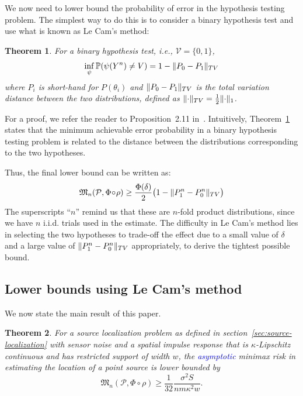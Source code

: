 \documentclass[conference]{IEEEtran}
\DeclarePairedDelimiter\norm{\lVert}{\rVert}
\newcommand{\Phiorho}{\Phi\!\circ\!\rho}
\newtheorem{theorem}{Theorem}
\begin{document}
We now need to lower bound the probability of error in the hypothesis testing
problem. The simplest way to do this is to consider a binary hypothesis test
and use what is known as Le Cam's method:
\begin{theorem} \label{thm:le-cam}
	For a binary hypothesis test, i.e., $\mathcal{V} = \{0, 1\}$,
	\begin{equation}
		\inf_\psi \mathbb P(\psi(Y^n) \neq V) = 1 - \norm{P_0 - P_1}_{TV}
	\end{equation}
	where $P_i$ is short-hand for $P(\theta_i)$ and $\norm{P_0 - P_1}_{TV}$ is
	the total variation distance between the two distributions, defined as
	$\norm{\cdot}_{TV} = \frac{1}{2} \norm{\cdot}_1$.
\end{theorem}
For a proof, we refer the reader to Proposition~2.11
in~\cite{Duchi2015Information}.  Intuitively, Theorem~\ref{thm:le-cam} states
that the minimum achievable error probability in a binary hypothesis testing
problem is related to the distance between the distributions corresponding to
the two hypotheses.

Thus, the final lower bound can be written as:
\begin{equation} \label{eq:le-cam-bound}
	\mathfrak{M}_n(\mathcal P, \Phiorho) \geq \frac{\Phi(\delta)}{2} \big(1 - \norm{P_1^n - P_0^n}_{TV}\big)
\end{equation}
The superscripts ``$n$'' remind us that these are $n$-fold product
distributions, since we have $n$ i.i.d. trials used in the estimate.  The
difficulty in Le Cam's method lies in selecting the two hypotheses to trade-off
the effect due to a small value of $\delta$ and a large value of $\norm{P_1^n -
P_0^n}_{TV}$ appropriately, to derive the tightest possible bound.

\subsection{Lower bounds using Le Cam's method}
\label{sec:lecam-lb}

We now state the main result of this paper.
\begin{theorem} \label{thm:main-lb}
	For a source localization problem as defined in
	section~\ref{sec:source-localization} with sensor noise and a spatial
	impulse response that is $\kappa$-Lipschitz continuous and has restricted
	support of width $w$, the \textcolor{blue}{asymptotic} minimax risk in estimating the
	location of a point source is lower bounded by
	\begin{equation} \label{eq:main-lower-bound}
		\mathfrak{M}_n(\mathcal{P}, \Phiorho) \geq \frac{1}{32} \frac{\sigma^2 S}{nm\kappa^2w}.
	\end{equation}
\end{theorem}
\end{document}
